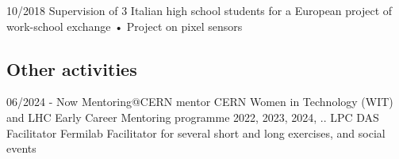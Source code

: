   \teaching
    {10/2018}
    {Supervision of 3 Italian high school students for a European project of work-school exchange • }
    {Project on pixel sensors}


\subsection{Other activities}
	\position
      {06/2024 - Now } 
      {Mentoring@CERN mentor}
      {CERN}
      {Women in Technology (WIT) and LHC Early Career Mentoring programme}
	\position
      {2022, 2023, 2024, ..} 
      {LPC DAS Facilitator}
      {Fermilab}
      {Facilitator for several short and long exercises, and social events}